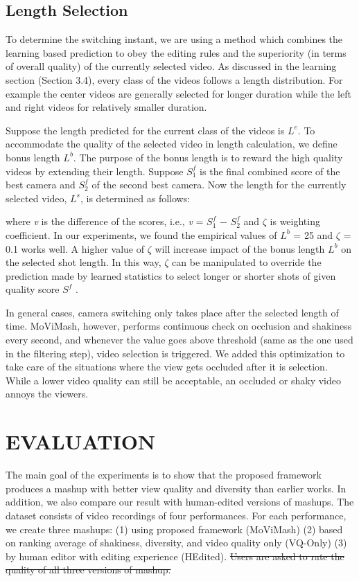 \documentclass{sig-alternate}
\providecommand{\DIFadd}[1]{{\protect\color{blue}\uwave{#1}}} %
\providecommand{\DIFdel}[1]{{\protect\color{red}\sout{#1}}}                      %
\providecommand{\DIFaddbegin}{} %
\providecommand{\DIFaddend}{} %
\providecommand{\DIFdelbegin}{} %
\providecommand{\DIFdelend}{} %
\begin{document}
\subsection{Length Selection}

To determine the switching instant, we are using a method which combines the learning based prediction to obey the editing rules and the superiority (in terms of overall quality) of the currently selected video. As discussed in the learning section (Section 3.4), every class of the videos follows a length distribution. For example the center videos are generally selected for longer duration while the left and right videos for relatively smaller duration.

Suppose the length predicted for the current class of the videos is $L^e$. To accommodate the quality of the selected video in length calculation, we define bonus length $L^b$. The purpose of the bonus length is to reward the high quality videos by extending their length. Suppose $S_1^f$ is the final combined score of the best camera and $S_2^f$ of the second best camera. Now the length for the currently selected video, $L^s$, is determined as follows:

where \textit{v} is the difference of the scores, i.e., \textit{v} = $S_1^f$ − $S_2^f$ and  $\zeta $ is weighting coefficient. In our experiments, we found the empirical values of $L^b$ = 25 and $\zeta$ = 0.1 works well. A higher value of
$\zeta$ will increase impact of the bonus length $L^b$ on the selected shot
length. In this way, $\zeta$ can be manipulated to override the prediction
made by learned statistics to select longer or shorter shots of given
quality score $S^f$ .

In general cases, camera switching only takes place after the selected length of time. MoViMash, however, performs continuous check on occlusion and shakiness every second, and whenever the
value goes above threshold (same as the one used in the filtering
step), video selection is triggered. We added this optimization to
take care of the situations where the view gets occluded after it is
selection. While a lower video quality can still be acceptable, an
occluded or shaky video annoys the viewers.

\section{EVALUATION}
The main goal of the experiments is to show that the proposed framework produces a mashup with better view quality and diversity than earlier works. In addition, we also compare our result with human-edited versions of mashups. The dataset consists of video recordings of four performances. For each performance, we create three mashups: (1) using proposed framework (MoViMash) (2) based on ranking average of shakiness, diversity, and video quality only (VQ-Only) (3) by human editor with editing experience (HEdited). \DIFdelbegin \DIFdel{Users are asked to rate the quality of all three versions of mashup.
}\DIFdelend \DIFaddbegin \DIFadd{this is evaluation
}\DIFaddend 
\end{document}
